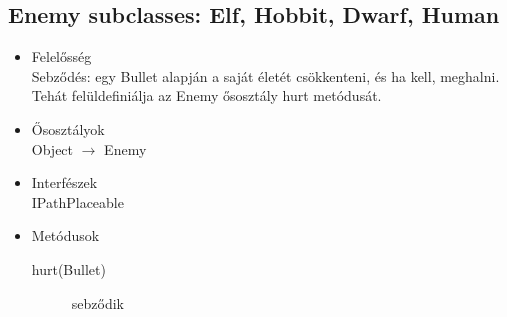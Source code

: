 \subsection{Enemy subclasses: Elf, Hobbit, Dwarf, Human}
\begin{itemize}
\item Felelősség\\
Sebződés: egy Bullet alapján a saját életét csökkenteni, és ha kell, meghalni. Tehát felüldefiniálja az Enemy ősosztály hurt metódusát.
\item Ősosztályok\\
Object $\rightarrow$ Enemy
\item Interfészek\\
IPathPlaceable

\item Metódusok\\
	\begin{description}
		\item[hurt(Bullet)] sebződik
		
	\end{description}
\end{itemize}



